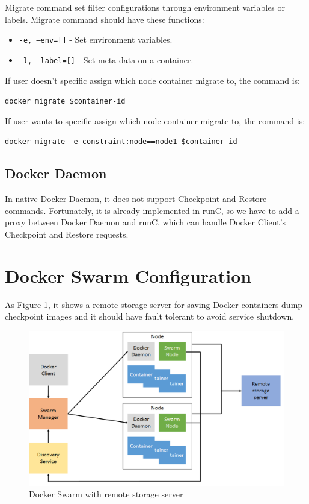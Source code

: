 Migrate command set filter configurations through environment variables or labels. Migrate command should have these functions:
\begin{itemize}
	\item \texttt{-e, --env=[]} - Set environment variables.
	\item \texttt{-l, --label=[]} - Set meta data on a container.
\end{itemize}

If user doesn't specific assign which node container migrate to, the command is:
\begin{center}
\texttt{docker migrate \$container-id}
\end{center}

If user wants to specific assign which node container migrate to, the command is:
\begin{center}
\texttt{docker migrate -e constraint:node==node1 \$container-id}
\end{center}

\subsection{Docker Daemon}
In native Docker Daemon, it does not support Checkpoint and Restore commands.
Fortunately, it is already implemented in runC, so we have to add a proxy between Docker Daemon and runC, which can handle Docker Client's Checkpoint and Restore requests.

\section{Docker Swarm Configuration}
As Figure \ref{fig:Docker Swarm with remote storage server}, it shows a remote storage server for saving Docker containers dump checkpoint images and it should have fault tolerant to avoid service shutdown.

\begin{figure}[h]
\begin{center}
\includegraphics[width=15cm]{figure/swarm_docker_remote.png}
\end{center}
\caption{Docker Swarm with remote storage server}
\label{fig:Docker Swarm with remote storage server}
\end{figure}

